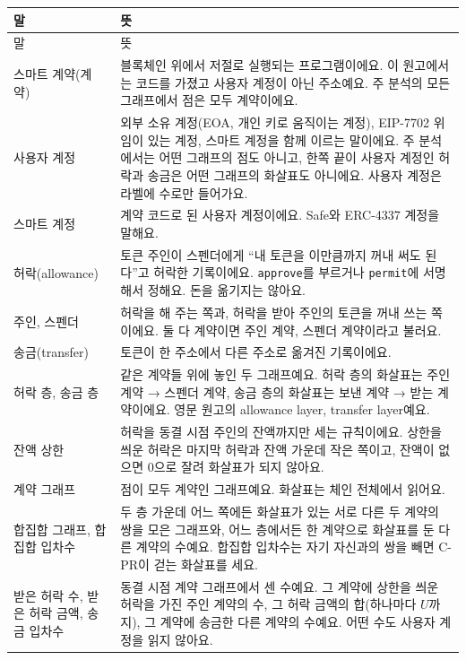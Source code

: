\documentclass[11pt]{article}
\begin{document}
{\small
\renewcommand{\arraystretch}{1.25}
\begin{longtable}{@{}L{3.6cm}L{\dimexpr\linewidth-3.6cm-2\tabcolsep\relax}@{}}
\toprule
말 & 뜻 \\
\midrule
\endfirsthead
\toprule
말 & 뜻 \\
\midrule
\endhead
\bottomrule
\endlastfoot
스마트 계약(계약) & 블록체인 위에서 저절로 실행되는 프로그램이에요. 이 원고에서는 코드를 가졌고 사용자 계정이 아닌 주소예요. 주 분석의 모든 그래프에서 점은 모두 계약이에요. \\
사용자 계정 & 외부 소유 계정(EOA, 개인 키로 움직이는 계정), EIP-7702 위임이 있는 계정, 스마트 계정을 함께 이르는 말이에요. 주 분석에서는 어떤 그래프의 점도 아니고, 한쪽 끝이 사용자 계정인 허락과 송금은 어떤 그래프의 화살표도 아니에요. 사용자 계정은 라벨에 수로만 들어가요. \\
스마트 계정 & 계약 코드로 된 사용자 계정이에요. Safe와 ERC-4337 계정을 말해요. \\
허락(allowance) & 토큰 주인이 스펜더에게 “내 토큰을 이만큼까지 꺼내 써도 된다”고 허락한 기록이에요. \texttt{approve}를 부르거나 \texttt{permit}에 서명해서 정해요. 돈을 옮기지는 않아요. \\
주인, 스펜더 & 허락을 해 주는 쪽과, 허락을 받아 주인의 토큰을 꺼내 쓰는 쪽이에요. 둘 다 계약이면 주인 계약, 스펜더 계약이라고 불러요. \\
송금(transfer) & 토큰이 한 주소에서 다른 주소로 옮겨진 기록이에요. \\
허락 층, 송금 층 & 같은 계약들 위에 놓인 두 그래프예요. 허락 층의 화살표는 주인 계약 → 스펜더 계약, 송금 층의 화살표는 보낸 계약 → 받는 계약이에요. 영문 원고의 allowance layer, transfer layer예요. \\
잔액 상한 & 허락을 동결 시점 주인의 잔액까지만 세는 규칙이에요. 상한을 씌운 허락은 마지막 허락과 잔액 가운데 작은 쪽이고, 잔액이 없으면 0으로 잘려 화살표가 되지 않아요. \\
계약 그래프 & 점이 모두 계약인 그래프예요. 화살표는 체인 전체에서 읽어요. \\
합집합 그래프, 합집합 입차수 & 두 층 가운데 어느 쪽에든 화살표가 있는 서로 다른 두 계약의 쌍을 모은 그래프와, 어느 층에서든 한 계약으로 화살표를 둔 다른 계약의 수예요. 합집합 입차수는 자기 자신과의 쌍을 빼면 C-PR이 걷는 화살표를 세요. \\
받은 허락 수, 받은 허락 금액, 송금 입차수 & 동결 시점 계약 그래프에서 센 수예요. 그 계약에 상한을 씌운 허락을 가진 주인 계약의 수, 그 허락 금액의 합(하나마다 $U$까지), 그 계약에 송금한 다른 계약의 수예요. 어떤 수도 사용자 계정을 읽지 않아요. \\

\end{longtable}}
\end{document}
